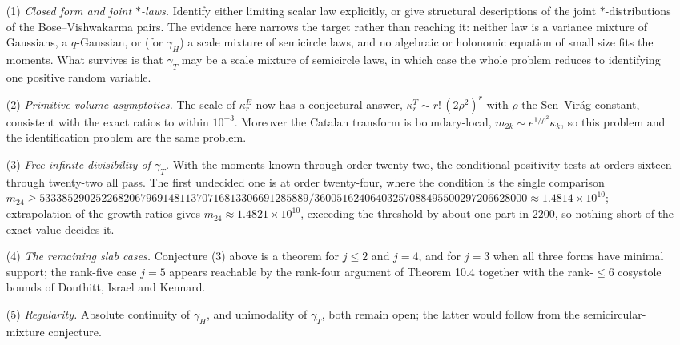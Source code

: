\begin{enumerate}
\item[(1)] \emph{Closed form and joint $*$-laws.}  Identify either
limiting scalar law explicitly, or give structural descriptions of the
joint $*$-distributions of the Bose--Vishwakarma pairs.  The evidence
here narrows the target rather than reaching it: neither law is a
variance mixture of Gaussians, a $q$-Gaussian, or (for $\gamma_H$) a
scale mixture of semicircle laws, and no algebraic or holonomic equation
of small size fits the moments.  What survives is that $\gamma_T$ may be
a scale mixture of semicircle laws, in which case the whole problem
reduces to identifying one positive random variable.

\item[(2)] \emph{Primitive-volume asymptotics.}  The scale of
$\kappa_r^E$ now has a conjectural answer,
$\kappa_r^T\sim r!\,(2\rho^2)^r$ with $\rho$ the Sen--Vir\'ag constant,
consistent with the exact ratios to within $10^{-3}$.  Moreover the
Catalan transform is boundary-local, $m_{2k}\sim e^{1/\rho^2}\kappa_k$,
so this problem and the identification problem are the same problem.

\item[(3)] \emph{Free infinite divisibility of $\gamma_T$.}  With the
moments known through order twenty-two, the conditional-positivity tests
at orders sixteen through twenty-two all pass.  The first undecided one
is at order twenty-four, where the condition is the single comparison
$m_{24}\ge533385290252268206796914811370716813306691285889/
36005162406403257088495500297206628000\approx1.4814\times10^{10}$;
extrapolation of the growth ratios gives $m_{24}\approx1.4821\times
10^{10}$, exceeding the threshold by about one part in $2200$, so
nothing short of the exact value decides it.

\item[(4)] \emph{The remaining slab cases.}  Conjecture (3) above is a
theorem for $j\le2$ and $j=4$, and for $j=3$ when all three forms have
minimal support; the rank-five case $j=5$ appears reachable by the
rank-four argument of Theorem 10.4 together with the rank-$\le6$
cosystole bounds of Douthitt, Israel and Kennard.

\item[(5)] \emph{Regularity.}  Absolute continuity of $\gamma_H$, and
unimodality of $\gamma_T$, both remain open; the latter would follow
from the semicircular-mixture conjecture.
\end{enumerate}
